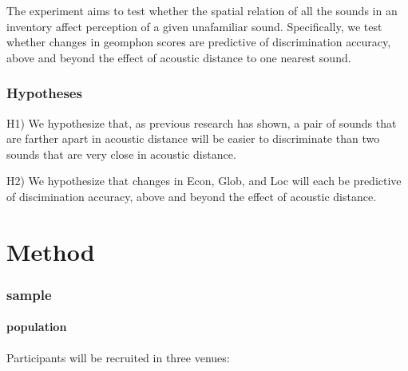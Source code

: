 \documentclass[]{article}
\let\oldparagraph\paragraph
\renewcommand{\paragraph}[1]{\oldparagraph{#1}\mbox{}}
\begin{document}
The experiment aims to test whether the spatial relation of all the
sounds in an inventory affect perception of a given unafamiliar sound.
Specifically, we test whether changes in geomphon scores are predictive
of discrimination accuracy, above and beyond the effect of acoustic
distance to one nearest sound.

\hypertarget{hypotheses}{%
\subsubsection{Hypotheses}\label{hypotheses}}

H1) We hypothesize that, as previous research has shown, a pair of
sounds that are farther apart in acoustic distance will be easier to
discriminate than two sounds that are very close in acoustic distance.

H2) We hypothesize that changes in Econ, Glob, and Loc will each be
predictive of discimination accuracy, above and beyond the effect of
acoustic distance.

\hypertarget{method}{%
\section{Method}\label{method}}

\hypertarget{sample}{%
\subsubsection{sample}\label{sample}}

\hypertarget{population}{%
\paragraph{population}\label{population}}

Participants will be recruited in three venues:
\end{document}
